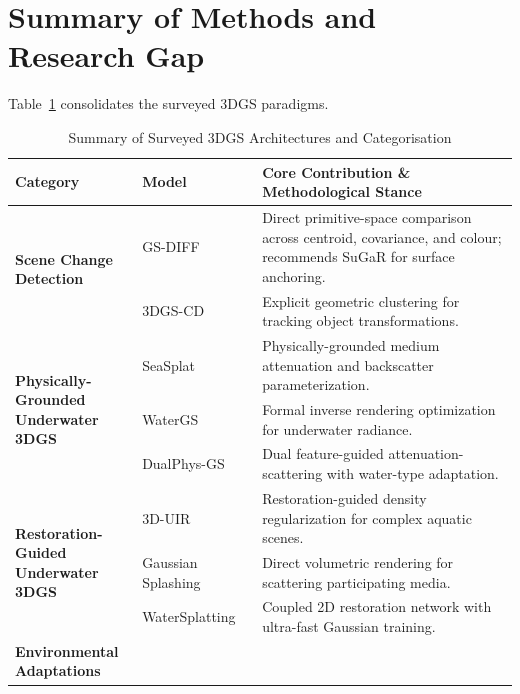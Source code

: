 \section{Summary of Methods and Research Gap}
\label{sec:lit_gap}
Table~\ref{tab:lit_methods_summary} consolidates the surveyed 3DGS paradigms.

\begin{table}[htbp]
    \centering
    \small
    \caption{Summary of Surveyed 3DGS Architectures and Categorisation}
    \label{tab:lit_methods_summary}
    \begin{tabularx}{\textwidth}{l l X}
        \toprule
        \textbf{Category} & \textbf{Model} & \textbf{Core Contribution \& Methodological Stance} \\
        \midrule
        \multirow{2}{*}{\parbox{2.8cm}{\textbf{Scene Change\\Detection}}} 
        & GS-DIFF~\cite{galappaththige2026pixelsprimitivesscenechange} & Direct primitive-space comparison across centroid, covariance, and colour; recommends SuGaR for surface anchoring. \\
        & 3DGS-CD~\cite{10852207} & Explicit geometric clustering for tracking object transformations. \\
        \midrule
        \multirow{3}{*}{\parbox{2.8cm}{\textbf{Physically-Grounded\\Underwater 3DGS}}} 
        & SeaSplat~\cite{11128502} & Physically-grounded medium attenuation and backscatter parameterization. \\
        & WaterGS~\cite{article} & Formal inverse rendering optimization for underwater radiance. \\
        & DualPhys-GS~\cite{LI2025104405} & Dual feature-guided attenuation-scattering with water-type adaptation. \\
        \midrule
        \multirow{3}{*}{\parbox{2.8cm}{\textbf{Restoration-Guided\\Underwater 3DGS}}} 
        & 3D-UIR~\cite{huang2025restorationreconstructionrethinking3d} & Restoration-guided density regularization for complex aquatic scenes. \\
        & Gaussian Splashing~\cite{mualem2025gaussiansplashingdirectvolumetric} & Direct volumetric rendering for scattering participating media. \\
        & WaterSplatting~\cite{li2025watersplattingfastunderwater3d} & Coupled 2D restoration network with ultra-fast Gaussian training. \\
        \midrule
        \multirow{2}{*}{\parbox{2.8cm}{\textbf{Environmental\\Adaptations}}} 

\end{tabularx}
\end{table}
